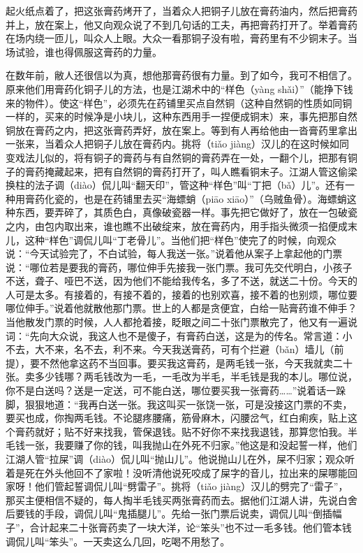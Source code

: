 \documentclass[12pt,UTF8]{ctexbook}
\begin{document}
起火纸点着了，把这张膏药烤开了，当着众人把铜子儿放在膏药油内，然后把膏药并上，放在案上，他又向观众说了不到几句话的工夫，再把膏药打开了。举着膏药在场内绕一匝儿，叫众人上眼。大众一看那铜子没有啦，膏药里有不少铜末子。当场试验，谁也得佩服这膏药的力量。

在数年前，敝人还很信以为真，想他那膏药很有力量。到了如今，我可不相信了。原来他们用膏药化铜子儿的方法，也是江湖术中的“样色（yàng shǎi）”（能挣下钱来的物件）。使这“样色”，必须先在药铺里买点自然铜（这种自然铜的性质如同铜一样的，买来的时候净是小块儿，这种东西用手一捏便成铜末）来，事先把那自然铜放在膏药之内，把这张膏药弄好，放在案上。等到有人再给他由一沓膏药里拿出一张来，当着众人把铜子儿放在膏药内。挑将（tiǎo jiàng）汉儿的在这时候如同变戏法儿似的，将有铜子的膏药与有自然铜的膏药弄在一处，一翻个儿，把那有铜子的膏药掩藏起来，把有自然铜的膏药打开了，叫人瞧看铜末子。江湖人管这偷梁换柱的法子调（diào）侃儿叫“翻天印”，管这种“样色”叫“丁把（bǎ）儿”。还有一种用膏药化瓷的，也是在药铺里去买“海螵蛸（piāo xiāo）”（乌贼鱼骨）。海螵蛸这种东西，要弄碎了，其质色白，真像破瓷器一样。事先把它做好了，放在一包破瓷之内，由包内取出来，谁也瞧不出破绽来，放在膏药内，用手指头微须一掐便成末儿，这种“样色”调侃儿叫“丁老骨儿”。当他们把“样色”使完了的时候，向观众说：“今天试验完了，不白试验，每人我送一张。”说着他从案子上拿起他的门票说：“哪位若是要我的膏药，哪位伸手先接我一张门票。我可先交代明白，小孩子不送，聋子、哑巴不送，因为他们不能给我传名，多了不送，就送二十份。今天的人可是太多。有接着的，有接不着的，接着的也别欢喜，接不着的也别烦，哪位要哪位伸手。”说着他就散他那门票。世上的人都是贪便宜，白给一贴膏药谁不伸手？当他散发门票的时候，人人都抢着接，眨眼之间二十张门票散完了，他又有一遍说词：“先向大众说，我这人也不是傻子，有膏药白送，这是为的传名。常言道：小不去，大不来，名不去，利不来。今天我送膏药，可有个拦避（bǎn）墙儿（前提），要不然他拿这药不当回事。要买我这膏药，是两毛钱一张，今天我就卖二十张。卖多少钱哪？两毛钱改为一毛，一毛改为半毛，半毛钱是我的本儿。哪位说，你不是白送吗？送是一定送，可不能白送，哪位要买我一张膏药……”说着话一跺脚，狠狠地道：“我再白送一张。我这叫买一张饶一张，可是没接这门票的不卖，要买也成，你掏两毛钱。不论腿疼腰痛，筋骨麻木，闪腰岔气，红白痢疾，贴上这个膏药就好；贴不好来找我，管保退钱。贴不好你不来找我退钱，那算您怕我。半毛钱一张，我要赚了你的钱，叫我抛山在外死不归家。”他这是和没起誓一样，他们江湖人管“拉屎”调（diào）侃儿叫“抛山儿”。他说抛山儿在外，屎不归家；观众听着是死在外头他回不了家啦！没听清他说死咬成了屎字的音儿，拉出来的屎哪能回家呀！他们管起誓调侃儿叫“劈雷子”。挑将（tiǎo jiàng）汉儿的劈完了“雷子”，那买主便相信不疑的，每人掏半毛钱买两张膏药而去。据他们江湖人讲，先说白舍后要钱的手段，调侃儿叫“鬼插腿儿”。先给一张门票后说卖，调侃儿叫“倒插幅子”，合计起来二十张膏药卖了一块大洋，论“笨头”也不过一毛多钱。他们管本钱调侃儿叫“笨头”。一天卖这么几回，吃喝不用愁了。
\end{document}
